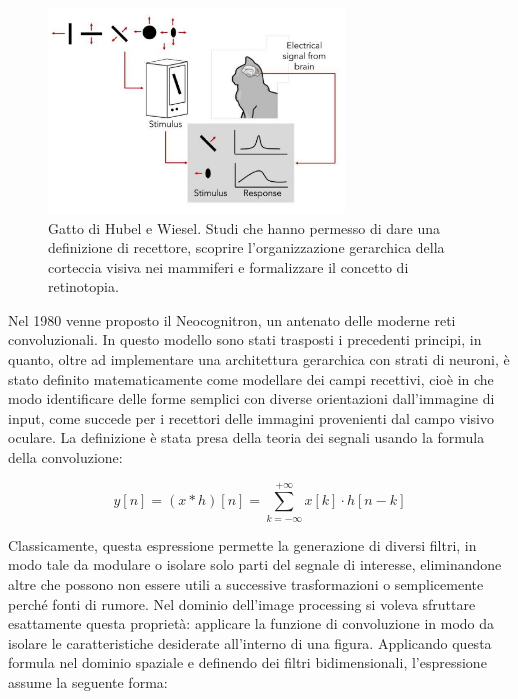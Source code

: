 \begin{figure}[htbp]
    \centering
    \includegraphics[width=0.7\textwidth]{figures/Hubel_and_Wiesel_cat.png}
    \caption{Gatto di Hubel e Wiesel\cite{b5catexp}. Studi che hanno permesso di dare una definizione di recettore, scoprire l'organizzazione gerarchica della corteccia visiva nei mammiferi e formalizzare il concetto di retinotopia.}
    \label{fig:chatto}
\end{figure}


\noindent Nel 1980 venne proposto il Neocognitron, un antenato delle moderne reti convoluzionali. In questo modello sono stati trasposti i precedenti principi, in quanto, oltre ad implementare una architettura gerarchica con strati di neuroni, è stato definito matematicamente come modellare dei campi recettivi, cioè in che modo identificare delle forme semplici con diverse orientazioni dall'immagine di input, come succede per i recettori delle immagini provenienti dal campo visivo oculare. La definizione è stata presa della teoria dei segnali usando la formula della convoluzione: 

\begin{equation} \label{eq:convolution}
y[n] = (x * h)[n] = \sum_{k=-\infty}^{+\infty} x[k] \cdot h[n - k]
\end{equation}

\noindent Classicamente, questa espressione permette la generazione di diversi filtri, in modo tale da modulare o isolare solo parti del segnale di interesse, eliminandone altre che possono non essere utili a successive trasformazioni o semplicemente perché fonti di rumore. Nel dominio dell'image processing si voleva sfruttare esattamente questa proprietà: applicare la funzione di convoluzione in modo da isolare le caratteristiche desiderate all'interno di una figura. Applicando questa formula nel dominio spaziale e definendo dei filtri bidimensionali, l'espressione assume la seguente forma: 

